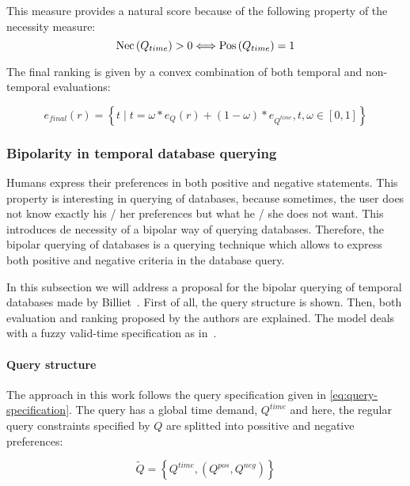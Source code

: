 This measure provides a natural score because of the following property of the necessity measure: 
\begin{equation}
\label{eq:necessity} %
\Nec \left( Q_{time} \right) > 0  \Longleftrightarrow  \Pos \left( Q_{time}\right) = 1
\end{equation}

The final ranking is given by a convex combination of both temporal and non-temporal evaluations:

\begin{equation}
\label{eq:convex-combination}
e_{final} \left( r \right) = \left \lbrace t \mid t = \omega \ast e_{Q} \left( r \right) + \left( 1- \omega \right) \ast e_{Q^{time}}, t,\omega \in \left[0,1\right] \right \rbrace
\end{equation}




\subsubsection{Bipolarity in temporal database querying}
\label{subsubsec:bipolarity}
Humans express their preferences in both positive and negative statements. This property is interesting in querying of databases, because sometimes, the user does not know exactly his / her preferences but what he / she does not want. This introduces de necessity of a bipolar way of querying databases. Therefore, the bipolar querying of databases is a querying technique which allows to express both positive and negative criteria in the database query.

In this subsection we will address a proposal for the bipolar querying of temporal databases made by Billiet~\cite{Billiet:Pons:Matthe:DeTre:Pons:2011:BipolarFuzzy}. First of all, the query structure is shown. Then, both evaluation and ranking proposed by the authors are explained. The model deals with a fuzzy valid-time specification as in~\cite{garrido2009}.

\paragraph{Query structure}
The approach in this work follows the query specification given in \eqref{eq:query-specification}. The query has a global time demand, $Q^{time}$ and here, the regular query constraints specified by $Q$ are splitted into possitive and negative preferences:

\begin{equation}
\label{eq:bipolar-specification}
\tilde{Q} = \left \lbrace Q^{time}, \left( Q^{pos}, Q^{neg} \right) \right \rbrace
\end{equation}

